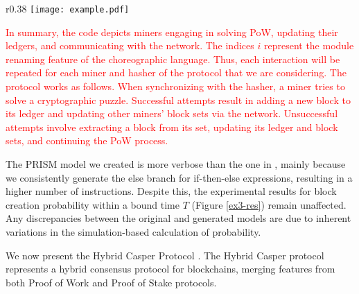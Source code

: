 \begin{wrapfigure}{r}{0.38\textwidth}
   \vspace{-0.75cm}
   \centering
   \texttt{[image: example.pdf]}	
   \vspace{-0.35cm}
   \caption{}
   \label{ex3-res}
   \vspace{-0.75cm}
\end{wrapfigure}
\textcolor{red}{In summary, the code depicts miners engaging in solving PoW, updating their ledgers, and communicating with the network. 
The indices $i$ represent the module renaming feature of the choreographic language. Thus, each interaction will be repeated for each miner and hasher of the protocol that we are considering. The protocol works as follows.
When synchronizing with the hasher, a miner tries to solve a cryptographic puzzle. Successful attempts result in adding a new block to its ledger and updating other miners' block sets via the network. Unsuccessful attempts involve extracting a block from its set, updating its ledger and block sets, and continuing the PoW process.}

The PRISM model we created is more verbose than the one in \cite{DBLP:journals/concurrency/BistarelliNGLMV23}, mainly because we consistently generate the else branch for if-then-else expressions, resulting in a higher number of instructions. Despite this, the experimental results for block creation probability within a bound time $T$ (Figure \ref{ex3-res}) remain unaffected. Any discrepancies between the original and generated models are due to inherent variations in the simulation-based calculation of probability.


\begin{comment}
\begin{wrapfigure}[12]{l}{4.5cm}
	\texttt{[image: ethereum.pdf]}	
\end{wrapfigure} 
\end{comment}
We now present the Hybrid Casper Protocol \cite{DBLP:journals/distribledger/GallettaLMV23}. The Hybrid Casper protocol represents a hybrid consensus protocol for blockchains, merging features from both Proof of Work and Proof of Stake protocols. 

